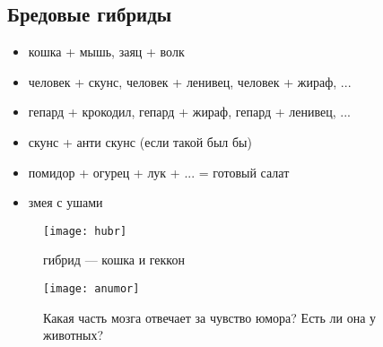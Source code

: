 \subsection{Бредовые гибриды}
\begin{itemize}
    \item кошка + мышь, заяц + волк
    \item человек + скунс, человек + ленивец, человек + жираф, ...
    \item гепард + крокодил, гепард + жираф, гепард + ленивец, ...
    \item скунс + анти скунс (если такой был бы)
    \item помидор + огурец + лук + ... = готовый салат
    \item змея с ушами
\end{itemize}

\begin{figure}[ht!]
    \centering
    \texttt{[image: hubr]}
    \caption{гибрид --- кошка и геккон}
\end{figure}

\begin{figure}[ht!]
    \centering
    \texttt{[image: anumor]}
    \caption{Какая часть мозга отвечает за чувство юмора? Есть ли она у животных?}
\end{figure}

